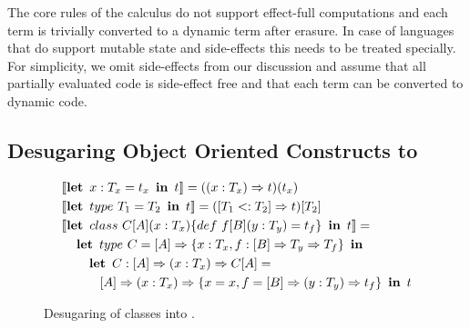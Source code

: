 
The core rules of the calculus do not support effect-full computations and each
  term is trivially converted to a dynamic term after erasure.
 In case of languages that do support mutable state and side-effects this needs to
 be treated specially. For simplicity, we omit side-effects from our discussion and
 assume that all partially evaluated code is side-effect free and that each
  term can be converted to dynamic code.

\subsection{Desugaring Object Oriented Constructs to \calculus}
\label{sct:desugaring}

\begin{figure}
\begin{alignat*}{2}
   & [\![ \klet\ x: T_x = t_x\ \kin \ t ]\!] = ((x: T_x) \ra t)(t_x)\\
   & [\![ \klet\ type\ T_1 = T_2\ \kin\ t ]\!] =  ([T_1 <: T_2] \ra t)[T_2] \\
   & [\![ \klet\ class\ C[A](x: T_x) \{ def\ f[B](y: T_y) = t_f \}\ \kin\ t ]\!]  =  \\
   & \quad   \klet\ type\  C = [A] \ra \{ x: T_x, f: [B] \ra T_y \ra T_f \}\ \kin  \\
   & \quad \quad \klet\ C: [A] \ra (x: T_x) \ra C[A]  =  \\
   & \quad \quad \quad [A] \ra (x: T_x) \ra \{ x = x, f = [B] \ra (y: T_y) \ra t_f \}\ \kin\ t
\end{alignat*}
\caption{Desugaring of classes into \calculus.}
\label{fig:desugaring-classes}
\end{figure}

